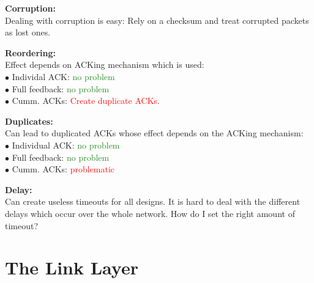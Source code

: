 \documentclass[a4paper, fontsize=8pt, landscape, DIV=1]{scrartcl}
\begin{document}
\begin{multicols*}{4}
		\textbf{Corruption:}\\
		Dealing with corruption is easy: Rely on a checksum and treat corrupted
		packets as lost ones. \par 
		
		\textbf{Reordering:}\\
		Effect depends on ACKing mechanism which is used:\\
		$\bullet$ Individal ACK: \textcolor{ForestGreen}{no problem}\\
		$\bullet$ Full feedback: \textcolor{ForestGreen}{no problem}\\
		$\bullet$ Cumm. ACKs: \textcolor{Red}{Create duplicate ACKs}.\par
		
		\textbf{Duplicates:}\\
		Can lead to duplicated ACKs whose effect depends on the ACKing mechanism:
		\\
		$\bullet$ Individual ACK: \textcolor{ForestGreen}{no problem}\\
		$\bullet$ Full feedback: \textcolor{ForestGreen}{no problem}\\
		$\bullet$ Cumm. ACKs: \textcolor{Red}{problematic}\par
		
		\textbf{Delay:}\\
		Can create useless timeouts for all designs. It is hard to deal with the
		different delays which occur over the whole network. How do I set the right
		amount of timeout?\\
		\newpage
		
		\section{The Link Layer}

\end{multicols*}
\end{document}
